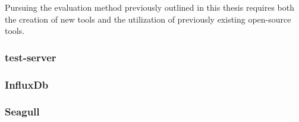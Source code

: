 Pursuing the evaluation method previously outlined in this thesis requires both
the creation of new tools and the utilization of previously existing open-source
tools.

\subsubsection{test-server}



\subsubsection{InfluxDb}



\subsubsection{Seagull}





